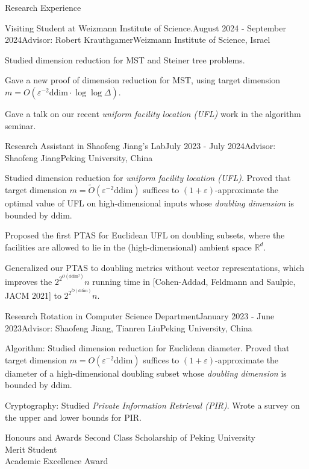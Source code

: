 \documentclass{resume} %
\begin{document}
\begin{rSection}{Research Experience}{}
    \begin{rSubsection}{Visiting Student at Weizmann Institute of Science.}{August 2024 - September 2024}{Advisor: Robert Krauthgamer}{Weizmann Institute of Science, Israel}
        \item Studied dimension reduction for MST and Steiner tree problems.
        \item Gave a new proof of dimension reduction for MST, using target dimension $m = O(\varepsilon^{-2} \mathrm{ddim} \cdot \log\log \Delta)$.
        \item Gave a talk on our recent \emph{uniform facility location (UFL)} work in the algorithm seminar.
    \end{rSubsection}

    \begin{rSubsection}{Research Assistant in Shaofeng Jiang's Lab}{July 2023 - July 2024}{Advisor: Shaofeng Jiang}{Peking University, China}
       \item Studied dimension reduction for \emph{uniform facility location (UFL)}. 
       Proved that target dimension $m = \tilde{O}(\varepsilon^{-2} \mathrm{ddim})$ suffices to $(1+\varepsilon)$-approximate the optimal value of UFL on high-dimensional inputs whose \emph{doubling dimension} is bounded by $\mathrm{ddim}$.
       \item Proposed the first PTAS for Euclidean UFL on doubling subsets, where the facilities are allowed to lie in the (high-dimensional) ambient space $\mathbb{R}^d$.
       \item Generalized our PTAS to doubling metrics without vector representations, which improves the $2^{2^{O(\mathrm{ddim^2})}} n$ running time in [Cohen-Addad, Feldmann and Saulpic, JACM 2021] to $2^{2^{\tilde O(\mathrm{ddim})}} n$.
    \end{rSubsection}

    \begin{rSubsection}{Research Rotation in Computer Science Department}{January 2023 - June 2023}{Advisor: Shaofeng Jiang, Tianren Liu}{Peking University, China}
        \item Algorithm: Studied dimension reduction for Euclidean diameter. 
        Proved that target dimension $m = O(\varepsilon^{-2} \mathrm{ddim})$ suffices to $(1+\varepsilon)$-approximate the diameter of a high-dimensional doubling subset whose \emph{doubling dimension} is bounded by $\mathrm{ddim}$.
        \item Cryptography: Studied \emph{Private Information Retrieval (PIR)}.
        Wrote a survey on the upper and lower bounds for PIR.
    \end{rSubsection}
\end{rSection}

\begin{rSection}{Honours and Awards}{}
    Second Class Scholarship of Peking University 
    \\ Merit Student 
    \\ Academic Excellence Award 
\end{rSection}
\end{document}
